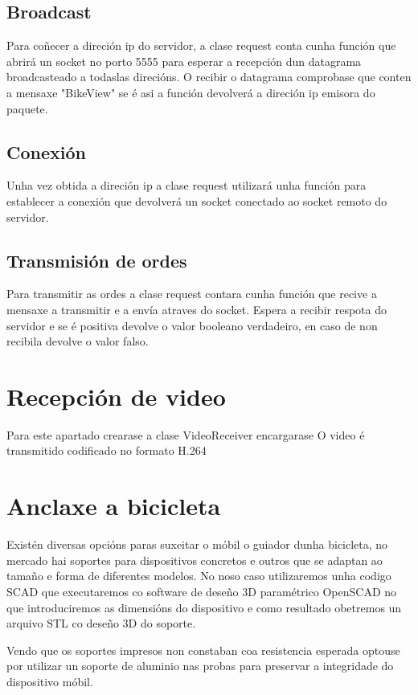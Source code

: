 \subsection{Broadcast}
Para coñecer a direción ip do servidor, a clase request conta cunha función que abrirá un socket no porto 5555 para esperar a recepción dun datagrama broadcasteado a todaslas direcións. O recibir o datagrama comprobase que conten a mensaxe "BikeView" se é asi a función devolverá a direción ip emisora do paquete.

\subsection{Conexión}
Unha vez obtida a direción ip a clase request utilizará unha función para establecer a conexión que devolverá un socket conectado ao socket remoto do servidor.

\subsection{Transmisión de ordes}
Para transmitir as ordes a clase request contara cunha función que recive a mensaxe a transmitir e a envía atraves do socket. Espera a recibir respota do servidor e se é positiva devolve o valor booleano verdadeiro, en caso de non recibila devolve o valor falso.

\section{Recepción de video}
Para este apartado crearase a clase VideoReceiver encargarase
O video é transmitido codificado no formato H.264

\section{Anclaxe a bicicleta}
Existén diversas opcións paras suxeitar o móbil o guiador dunha bicicleta, no mercado hai soportes para dispositivos concretos e outros que se adaptan ao tamaño e forma de diferentes modelos. No noso caso utilizaremos unha codigo SCAD que executaremos co software de deseño 3D paramétrico OpenSCAD no que introduciremos as dimensións do dispositivo e como resultado obetremos un arquivo STL co deseño 3D do soporte.

Vendo que os soportes impresos non constaban coa resistencia esperada optouse por utilizar un soporte de aluminio nas probas para preservar a integridade do dispositivo móbil.
